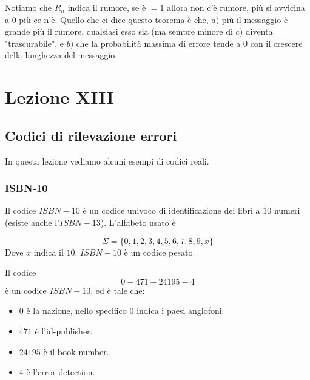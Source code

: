 \documentclass[12pt]{report}
\begin{document}
    \noindent
    Notiamo che $R_n$ indica il rumore, se è $= 1$ allora non c'è rumore, più si avvicina a $0$ più ce n'è. Quello che ci dice questo teorema è che, $a)$  più il messaggio è grande più il rumore, qualsiasi esso sia (ma sempre minore di $c$) diventa "trascurabile", e $b)$ che la probabilità massima di errore tende a $0$ con il crescere della lunghezza del messaggio.

    \chapter{Lezione XIII}


    \section{Codici di rilevazione errori}

    In questa lezione vediamo alcuni esempi di codici reali.

    \subsection{ISBN-10}

    Il codice $ISBN-10$ è un codice univoco di identificazione dei libri a $10$ numeri (esiste anche l'$ISBN-13$).  L'alfabeto usato è

    $$\Sigma = \{0,1,2,3,4,5,6,7,8,9,x\}$$
    Dove $x$ indica il $10$. $ISBN-10$ è un codice pesato.

    \begin{exmp}
        Il codice
        $$ 0-471-24195-4$$
        è un codice $ISBN-10$, ed è tale che:

        \begin{itemize}
            \item $0$ è la nazione, nello specifico $0$ indica i paesi anglofoni.
            \item $471$ è l'id-publisher.
            \item $24195$ è il book-number.
            \item $4$ è l'error detection.
        \end{itemize}
    \end{exmp}
\end{document}

